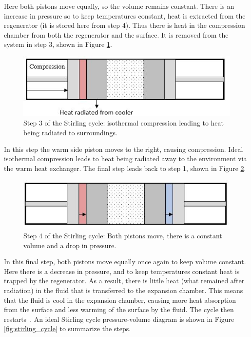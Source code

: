 Here both pistons move equally, so the volume remains constant. There is an increase in pressure so to keep temperatures constant, heat is extracted from the regenerator (it is stored here from step 4). Thus there is heat in the compression chamber from both the regenerator and the surface. It is removed from the system in step 3, shown in Figure \ref{fig:stirling_cycle_part_3}.

\begin{figure}[h]
\centering
  \includegraphics[width=0.8\linewidth]{chap2_images/stirling_process_heat_radiation.JPG}
  \caption{Step 3 of the Stirling cycle: isothermal compression leading to heat being radiated to surroundings.}
  \label{fig:stirling_cycle_part_3}
\end{figure}

In this step the warm side piston moves to the right, causing compression. Ideal isothermal compression leads to heat being radiated away to the environment via the warm heat exchanger. The final step leads back to step 1, shown in Figure \ref{fig:stirling_cycle_part_4}.

\begin{figure}[h]
\centering
  \includegraphics[width=0.8\linewidth]{chap2_images/stirling_process_heat_transfer.JPG}
  \caption{Step 4 of the Stirling cycle: Both pistons move, there is a constant volume and a drop in pressure.}
  \label{fig:stirling_cycle_part_4}
\end{figure}

In this final step, both pistons move equally once again to keep volume constant. Here there is a decrease in pressure, and to keep temperatures constant heat is trapped by the regenerator. As a result, there is little heat (what remained after radiation) in the fluid that is transferred to the expansion chamber. This means that the fluid is cool in the expansion chamber, causing more heat absorption from the surface and less warming of the surface by the fluid. The cycle then restarts~\citep{cryocoolers}. An ideal Stirling cycle pressure-volume diagram is shown in Figure \ref{fig:stirling_cycle} to summarize the steps.


